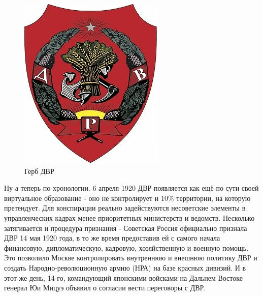 \begin{figure}[h!tb] 
	\centering\includegraphics[scale=0.6]{Glava6/njN-LQYB2jI.jpg}
	\caption{Герб ДВР}%
\end{figure}

Ну а теперь по хронологии. 6 апреля 1920 ДВР появляется как ещё по сути своей виртуальное образование - оно не контролирует и 10\% территории, на которую претендует. Для конспирации реально задействуются несоветские элементы в управленческих кадрах менее приоритетных министерств и ведомств. Несколько затягивается и процедура признания - Советская Россия официально признала ДВР 14 мая 1920 года, в то же время предоставив ей с самого начала финансовую, дипломатическую, кадровую, хозяйственную и военную помощь. Это позволило Москве контролировать внутреннюю и внешнюю политику ДВР и создать Народно-революционную армию (НРА) на базе красных дивизий. И в этот же день, 14-го, командующий японскими войсками на Дальнем Востоке генерал Юи Мицуэ объявил о согласии вести переговоры с ДВР. 

